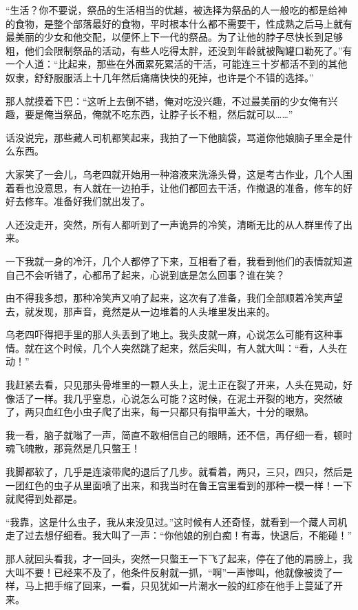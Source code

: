 “生活？你不要说，祭品的生活相当的优越，被选择为祭品的人一般吃的都是给神的食物，是整个部落最好的食物，平时根本什么都不需要干，性成熟之后马上就有最美丽的少女和他交配，以便怀上下一代的祭品。为了让他的脖子尽快长到足够粗，他们会限制祭品的活动，有些人吃得太胖，还没到年龄就被陶罐口勒死了。”有一个人道：“比起来，那些在外面累死累活的干活，可能连三十岁都活不到的其他奴隶，舒舒服服活上十几年然后痛痛快快的死掉，也许是个不错的选择。”

那人就摸着下巴：“这听上去倒不错，俺对吃没兴趣，不过最美丽的少女俺有兴趣，要是俺当祭品，俺就不吃东西，让脖子长不粗，然后就可以……”

话没说完，那些藏人司机都笑起来，我拍了一下他脑袋，骂道你他娘脑子里全是什么东西。

大家笑了一会儿，乌老四就开始用一种溶液来洗涤头骨，这是考古作业，几个人围着看也没意思，有人就在一边拍手，让他们都回去干活，作撤退的准备，修车的好好去修车。准备好我们就出发了。

人还没走开，突然，所有人都听到了一声诡异的冷笑，清晰无比的从人群里传了出来。

一下我就一身的冷汗，几个人都停了下来，互相看了看，我看到他们的表情就知道自己不会听错了，心都吊了起来，心说到底是怎么回事？谁在笑？

由不得我多想，那种冷笑声又响了起来，这次有了准备，我们全部顺着冷笑声望去，就发现，那声音，竟然是从一边堆着的人头堆里发出来的。

乌老四吓得把手里的那人头丢到了地上。我头皮就一麻，心说怎么可能有这种事情。就在这个时候，几个人突然跳了起来，然后尖叫，有人就大叫：“看，人头在动！”

我赶紧去看，只见那头骨堆里的一颗人头上，泥土正在裂了开来，人头在晃动，好像活了一样。我几乎窒息，心说怎么可能？这时候，在泥土开裂的地方，突然破了，两只血红色小虫子爬了出来，每一只都只有指甲盖大，十分的眼熟。

我一看，脑子就嗡了一声，简直不敢相信自己的眼睛，还不信，再仔细一看，顿时魂飞魄散，那竟然是几只蟞王！

我脚都软了，几乎是连滚带爬的退后了几步。就看着，两只，三只，四只，然后是一团红色的虫子从里面喷了出来，和我当时在鲁王宫里看到的那种一模一样！一下就爬得到处都是。

“我靠，这是什么虫子，我从来没见过。”这时候有人还奇怪，就看到一个藏人司机走了过去想仔细看。我大叫了一声：“你他娘的别白痴！有毒，快退后，不能碰！”

那人就回头看我，才一回头，突然一只蟞王一下飞了起来，停在了他的肩膀上，我大叫不要！已经来不及了，他条件反射就一抓，“啊”一声惨叫，他就像被烫了一样，马上把手缩了回来，一看，只见犹如一片潮水一般的红疹在他手上蔓延了开来。

